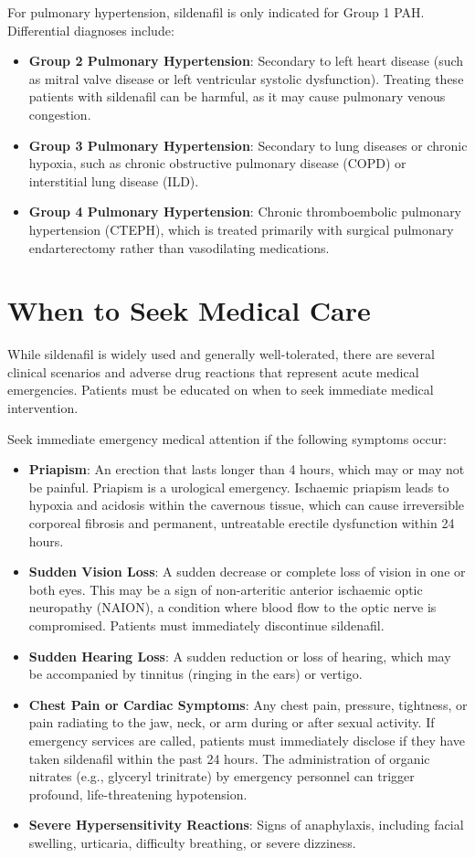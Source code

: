 For pulmonary hypertension, sildenafil is only indicated for Group 1 PAH. Differential diagnoses include:
\begin{itemize}
    \item \textbf{Group 2 Pulmonary Hypertension}: Secondary to left heart disease (such as mitral valve disease or left ventricular systolic dysfunction). Treating these patients with sildenafil can be harmful, as it may cause pulmonary venous congestion.
    \item \textbf{Group 3 Pulmonary Hypertension}: Secondary to lung diseases or chronic hypoxia, such as chronic obstructive pulmonary disease (COPD) or interstitial lung disease (ILD).
    \item \textbf{Group 4 Pulmonary Hypertension}: Chronic thromboembolic pulmonary hypertension (CTEPH), which is treated primarily with surgical pulmonary endarterectomy rather than vasodilating medications.
\end{itemize}

\section*{When to Seek Medical Care}
While sildenafil is widely used and generally well-tolerated, there are several clinical scenarios and adverse drug reactions that represent acute medical emergencies. Patients must be educated on when to seek immediate medical intervention.

Seek immediate emergency medical attention if the following symptoms occur:
\begin{itemize}
    \item \textbf{Priapism}: An erection that lasts longer than 4 hours, which may or may not be painful. Priapism is a urological emergency. Ischaemic priapism leads to hypoxia and acidosis within the cavernous tissue, which can cause irreversible corporeal fibrosis and permanent, untreatable erectile dysfunction within 24 hours.
    \item \textbf{Sudden Vision Loss}: A sudden decrease or complete loss of vision in one or both eyes. This may be a sign of non-arteritic anterior ischaemic optic neuropathy (NAION), a condition where blood flow to the optic nerve is compromised. Patients must immediately discontinue sildenafil.
    \item \textbf{Sudden Hearing Loss}: A sudden reduction or loss of hearing, which may be accompanied by tinnitus (ringing in the ears) or vertigo.
    \item \textbf{Chest Pain or Cardiac Symptoms}: Any chest pain, pressure, tightness, or pain radiating to the jaw, neck, or arm during or after sexual activity. If emergency services are called, patients must immediately disclose if they have taken sildenafil within the past 24 hours. The administration of organic nitrates (e.g., glyceryl trinitrate) by emergency personnel can trigger profound, life-threatening hypotension.
    \item \textbf{Severe Hypersensitivity Reactions}: Signs of anaphylaxis, including facial swelling, urticaria, difficulty breathing, or severe dizziness.
\end{itemize}


